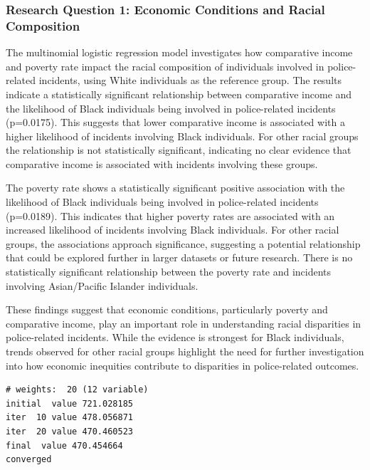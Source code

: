\documentclass[
  letterpaper,
  DIV=11,
  numbers=noendperiod]{scrartcl}
\begin{document}
\subsubsection{Research Question 1: Economic Conditions and Racial
Composition}\label{research-question-1-economic-conditions-and-racial-composition-1}

The multinomial logistic regression model investigates how comparative
income and poverty rate impact the racial composition of individuals
involved in police-related incidents, using White individuals as the
reference group. The results indicate a statistically significant
relationship between comparative income and the likelihood of Black
individuals being involved in police-related incidents (p=0.0175). This
suggests that lower comparative income is associated with a higher
likelihood of incidents involving Black individuals. For other racial
groups the relationship is not statistically significant, indicating no
clear evidence that comparative income is associated with incidents
involving these groups.

The poverty rate shows a statistically significant positive association
with the likelihood of Black individuals being involved in
police-related incidents (p=0.0189). This indicates that higher poverty
rates are associated with an increased likelihood of incidents involving
Black individuals. For other racial groups, the associations approach
significance, suggesting a potential relationship that could be explored
further in larger datasets or future research. There is no statistically
significant relationship between the poverty rate and incidents
involving Asian/Pacific Islander individuals.

These findings suggest that economic conditions, particularly poverty
and comparative income, play an important role in understanding racial
disparities in police-related incidents. While the evidence is strongest
for Black individuals, trends observed for other racial groups highlight
the need for further investigation into how economic inequities
contribute to disparities in police-related outcomes.

\begin{verbatim}
# weights:  20 (12 variable)
initial  value 721.028185 
iter  10 value 478.056871
iter  20 value 470.460523
final  value 470.454664 
converged
\end{verbatim}
\end{document}
